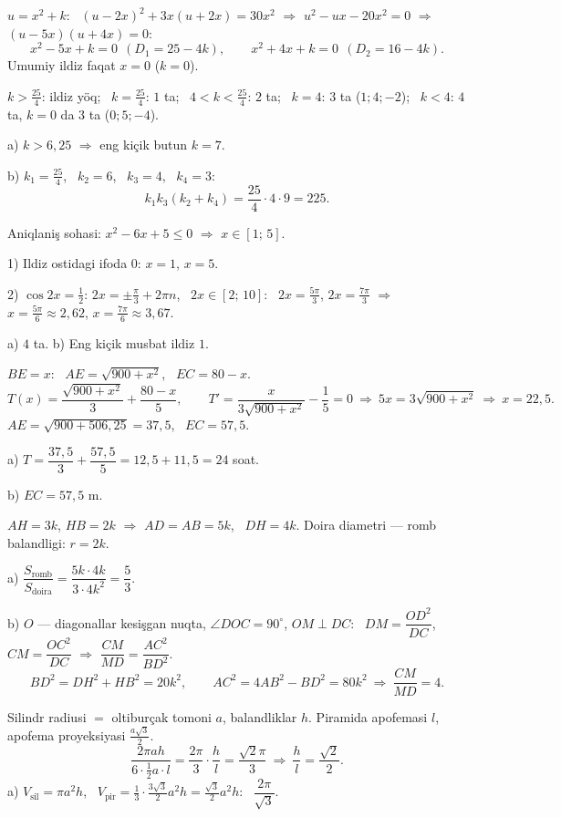 \newpage
{}
$u=x^2+k$: \ $(u-2x)^2+3x(u+2x)=30x^2$ $\Rightarrow$ $u^2-ux-20x^2=0$ $\Rightarrow$ $(u-5x)(u+4x)=0$:
\[x^2-5x+k=0\ \ (D_1=25-4k),\qquad x^2+4x+k=0\ \ (D_2=16-4k).\]
Umumiy ildiz faqat $x=0$ ($k=0$).

$k>\frac{25}4$: ildiz yöq; \ $k=\frac{25}4$: $1$ ta; \ $4<k<\frac{25}4$: $2$ ta; \ $k=4$: $3$ ta ($1;4;-2$); \ $k<4$: $4$ ta, $k=0$ da $3$ ta ($0;5;-4$).

a) $k>6{,}25$ $\Rightarrow$ eng kiçik butun $k=7$.

b) $k_1=\frac{25}4$, \ $k_2=6$, \ $k_3=4$, \ $k_4=3$:
\[k_1k_3(k_2+k_4)=\frac{25}4\cdot4\cdot9=225.\]

\newpage
{}
Aniqlaniş sohasi: $x^2-6x+5\le0$ $\Rightarrow$ $x\in[1;\,5]$.

1) Ildiz ostidagi ifoda $0$: $x=1$, $x=5$.

2) $\cos2x=\frac12$: $2x=\pm\frac\pi3+2\pi n$, \ $2x\in[2;\,10]$: \ $2x=\frac{5\pi}3$, $2x=\frac{7\pi}3$ $\Rightarrow$ $x=\frac{5\pi}6\approx2{,}62$, $x=\frac{7\pi}6\approx3{,}67$.

a) $4$ ta. \quad b) Eng kiçik musbat ildiz $1$.

\newpage
{}
$BE=x$: \ $AE=\sqrt{900+x^2}$, \ $EC=80-x$.
\[T(x)=\frac{\sqrt{900+x^2}}3+\frac{80-x}5,\qquad T'=\frac x{3\sqrt{900+x^2}}-\frac15=0\ \Rightarrow\ 5x=3\sqrt{900+x^2}\ \Rightarrow\ x=22{,}5.\]
$AE=\sqrt{900+506{,}25}=37{,}5$, \ $EC=57{,}5$.

a) $T=\dfrac{37{,}5}3+\dfrac{57{,}5}5=12{,}5+11{,}5=24$ soat.

b) $EC=57{,}5$ m.

\newpage
{}
$AH=3k$, $HB=2k$ $\Rightarrow$ $AD=AB=5k$, \ $DH=4k$. Doira diametri — romb balandligi: $r=2k$.

a) $\dfrac{S_{\text{romb}}}{S_{\text{doira}}}=\dfrac{5k\cdot4k}{3\cdot4k^2}=\dfrac53$.

b) $O$ — diagonallar kesişgan nuqta, $\angle DOC=90^\circ$, $OM\perp DC$: \ $DM=\dfrac{OD^2}{DC}$, $CM=\dfrac{OC^2}{DC}$ $\Rightarrow$ $\dfrac{CM}{MD}=\dfrac{AC^2}{BD^2}$.
\[BD^2=DH^2+HB^2=20k^2,\qquad AC^2=4AB^2-BD^2=80k^2\ \Rightarrow\ \frac{CM}{MD}=4.\]

\newpage
{}
Silindr radiusi $=$ oltiburçak tomoni $a$, balandliklar $h$. Piramida apofemasi $l$, apofema proyeksiyasi $\frac{a\sqrt3}2$.
\[\frac{2\pi ah}{6\cdot\frac12a\cdot l}=\frac{2\pi}3\cdot\frac hl=\frac{\sqrt2\pi}3\ \Rightarrow\ \frac hl=\frac{\sqrt2}2.\]
a) $V_{\text{sil}}=\pi a^2h$, \ $V_{\text{pir}}=\frac13\cdot\frac{3\sqrt3}2a^2h=\frac{\sqrt3}2a^2h$: \ $\dfrac{2\pi}{\sqrt3}$.

